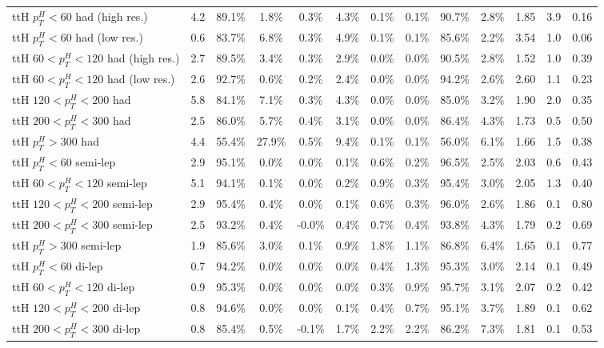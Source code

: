 \begin{table}
\begin{tabular}{lcccccccccccc}
ttH $p_{T}^{H} < 60$ had (high res.) & 4.2 & 89.1\% & 1.8\% & 0.3\% & 4.3\% & 0.1\% & 0.1\% & 90.7\% & 2.8\% & 1.85 & 3.9 & 0.16 \\
ttH $p_{T}^{H} < 60$ had (low res.) & 0.6 & 83.7\% & 6.8\% & 0.3\% & 4.9\% & 0.1\% & 0.1\% & 85.6\% & 2.2\% & 3.54 & 1.0 & 0.06 \\
ttH $60 < p_{T}^{H} < 120$ had (high res.) & 2.7 & 89.5\% & 3.4\% & 0.3\% & 2.9\% & 0.0\% & 0.0\% & 90.5\% & 2.8\% & 1.52 & 1.0 & 0.39 \\
ttH $60 < p_{T}^{H} < 120$ had (low res.) & 2.6 & 92.7\% & 0.6\% & 0.2\% & 2.4\% & 0.0\% & 0.0\% & 94.2\% & 2.6\% & 2.60 & 1.1 & 0.23 \\
ttH $120 < p_{T}^{H} < 200$ had & 5.8 & 84.1\% & 7.1\% & 0.3\% & 4.3\% & 0.0\% & 0.0\% & 85.0\% & 3.2\% & 1.90 & 2.0 & 0.35 \\
ttH $200 < p_{T}^{H} < 300$ had & 2.5 & 86.0\% & 5.7\% & 0.4\% & 3.1\% & 0.0\% & 0.0\% & 86.4\% & 4.3\% & 1.73 & 0.5 & 0.50 \\
ttH $p_{T}^{H} > 300$ had & 4.4 & 55.4\% & 27.9\% & 0.5\% & 9.4\% & 0.1\% & 0.1\% & 56.0\% & 6.1\% & 1.66 & 1.5 & 0.38 \\
ttH $p_{T}^{H} < 60$ semi-lep & 2.9 & 95.1\% & 0.0\% & 0.0\% & 0.1\% & 0.6\% & 0.2\% & 96.5\% & 2.5\% & 2.03 & 0.6 & 0.43 \\
ttH $60 < p_{T}^{H} < 120$ semi-lep & 5.1 & 94.1\% & 0.1\% & 0.0\% & 0.2\% & 0.9\% & 0.3\% & 95.4\% & 3.0\% & 2.05 & 1.3 & 0.40 \\
ttH $120 < p_{T}^{H} < 200$ semi-lep & 2.9 & 95.4\% & 0.4\% & 0.0\% & 0.1\% & 0.6\% & 0.3\% & 96.0\% & 2.6\% & 1.86 & 0.1 & 0.80 \\
ttH $200 < p_{T}^{H} < 300$ semi-lep & 2.5 & 93.2\% & 0.4\% & -0.0\% & 0.4\% & 0.7\% & 0.4\% & 93.8\% & 4.3\% & 1.79 & 0.2 & 0.69 \\
ttH $p_{T}^{H} > 300$ semi-lep & 1.9 & 85.6\% & 3.0\% & 0.1\% & 0.9\% & 1.8\% & 1.1\% & 86.8\% & 6.4\% & 1.65 & 0.1 & 0.77 \\
ttH $p_{T}^{H} < 60$ di-lep & 0.7 & 94.2\% & 0.0\% & 0.0\% & 0.0\% & 0.4\% & 1.3\% & 95.3\% & 3.0\% & 2.14 & 0.1 & 0.49 \\
ttH $60 < p_{T}^{H} < 120$ di-lep & 0.9 & 95.3\% & 0.0\% & 0.0\% & 0.0\% & 0.3\% & 0.9\% & 95.7\% & 3.1\% & 2.07 & 0.2 & 0.42 \\
ttH $120 < p_{T}^{H} < 200$ di-lep & 0.8 & 94.6\% & 0.0\% & 0.0\% & 0.1\% & 0.4\% & 0.7\% & 95.1\% & 3.7\% & 1.89 & 0.1 & 0.62 \\
ttH $200 < p_{T}^{H} < 300$ di-lep & 0.8 & 85.4\% & 0.5\% & -0.1\% & 1.7\% & 2.2\% & 2.2\% & 86.2\% & 7.3\% & 1.81 & 0.1 & 0.53 \\

\end{tabular}
\end{table}

